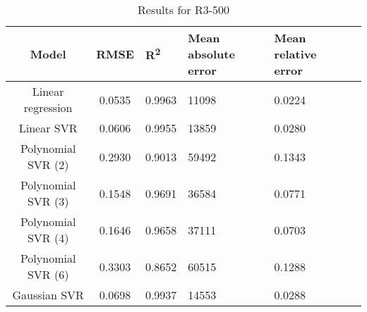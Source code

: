 \begin{table}[H]
\centering
\begin{adjustbox}{center}
\begin{tabular}{c | c M{1.2cm} M{2.5cm} M{2.5cm} M{1.8cm}}
Model & RMSE & R\textsuperscript{2} & Mean absolute error & Mean relative error \tabularnewline
\hline
Linear regression & 0.0535 & 0.9963 &  11098 & 0.0224 \\
Linear SVR & 0.0606 & 0.9955 &  13859 & 0.0280 \\
Polynomial SVR (2) & 0.2930 & 0.9013 &  59492 & 0.1343 \\
Polynomial SVR (3) & 0.1548 & 0.9691 &  36584 & 0.0771 \\
Polynomial SVR (4) & 0.1646 & 0.9658 &  37111 & 0.0703 \\
Polynomial SVR (6) & 0.3303 & 0.8652 &  60515 & 0.1288 \\
Gaussian SVR & 0.0698 & 0.9937 &  14553 & 0.0288 \\
\end{tabular}
\end{adjustbox}
\\
\caption{Results for R3-500}
\label{tab:coreonly_linear_R3_500}
\end{table}
